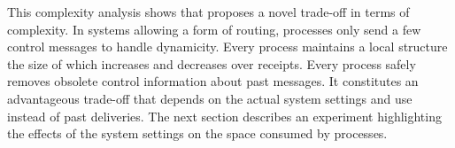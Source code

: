 This complexity analysis shows that \RPCBROADCAST proposes a novel trade-off in
terms of complexity. In systems allowing a form of routing, processes only send
a few control messages to handle dynamicity. Every process maintains a local
structure the size of which increases and decreases over receipts. Every process
safely removes obsolete control information about past messages. It constitutes
an advantageous trade-off that depends on the actual system settings and use
instead of past deliveries. The next section describes an experiment
highlighting the effects of the system settings on the space consumed by
processes.

